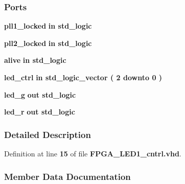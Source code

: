 \subsubsection*{Ports}
 \begin{DoxyCompactItemize}
\item 
{\bf pll1\+\_\+locked}  {\bfseries {\bfseries \textcolor{keywordflow}{in}\textcolor{vhdlchar}{ }}} {\bfseries \textcolor{comment}{std\+\_\+logic}\textcolor{vhdlchar}{ }} 
\item 
{\bf pll2\+\_\+locked}  {\bfseries {\bfseries \textcolor{keywordflow}{in}\textcolor{vhdlchar}{ }}} {\bfseries \textcolor{comment}{std\+\_\+logic}\textcolor{vhdlchar}{ }} 
\item 
{\bf alive}  {\bfseries {\bfseries \textcolor{keywordflow}{in}\textcolor{vhdlchar}{ }}} {\bfseries \textcolor{comment}{std\+\_\+logic}\textcolor{vhdlchar}{ }} 
\item 
{\bf led\+\_\+ctrl}  {\bfseries {\bfseries \textcolor{keywordflow}{in}\textcolor{vhdlchar}{ }}} {\bfseries \textcolor{comment}{std\+\_\+logic\+\_\+vector}\textcolor{vhdlchar}{ }\textcolor{vhdlchar}{(}\textcolor{vhdlchar}{ }\textcolor{vhdlchar}{ } \textcolor{vhdldigit}{2} \textcolor{vhdlchar}{ }\textcolor{keywordflow}{downto}\textcolor{vhdlchar}{ }\textcolor{vhdlchar}{ } \textcolor{vhdldigit}{0} \textcolor{vhdlchar}{ }\textcolor{vhdlchar}{)}\textcolor{vhdlchar}{ }} 
\item 
{\bf led\+\_\+g}  {\bfseries {\bfseries \textcolor{keywordflow}{out}\textcolor{vhdlchar}{ }}} {\bfseries \textcolor{comment}{std\+\_\+logic}\textcolor{vhdlchar}{ }} 
\item 
{\bf led\+\_\+r}  {\bfseries {\bfseries \textcolor{keywordflow}{out}\textcolor{vhdlchar}{ }}} {\bfseries \textcolor{comment}{std\+\_\+logic}\textcolor{vhdlchar}{ }} 
\end{DoxyCompactItemize}


\subsubsection{Detailed Description}


Definition at line {\bf 15} of file {\bf F\+P\+G\+A\+\_\+\+L\+E\+D1\+\_\+cntrl.\+vhd}.



\subsubsection{Member Data Documentation}
